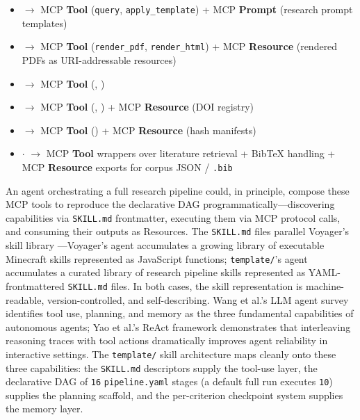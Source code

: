 \documentclass[
  english,
]{article}
\providecommand{\tightlist}{%
  \setlength{\itemsep}{0pt}\setlength{\parskip}{0pt}}
\begin{document}
\begin{itemize}
\tightlist
\item
   \texorpdfstring{\ensuremath{\to}}{->} MCP \textbf{Tool} (\texttt{query},
  \texttt{apply\_template}) + MCP \textbf{Prompt} (research prompt
  templates)
\item
   \texorpdfstring{\ensuremath{\to}}{->} MCP \textbf{Tool}
  (\texttt{render\_pdf}, \texttt{render\_html}) + MCP \textbf{Resource}
  (rendered PDFs as URI-addressable resources)
\item
   \texorpdfstring{\ensuremath{\to}}{->} MCP \textbf{Tool}
  (, )
\item
   \texorpdfstring{\ensuremath{\to}}{->} MCP \textbf{Tool}
  (, ) +
  MCP \textbf{Resource} (DOI registry)
\item
   \texorpdfstring{\ensuremath{\to}}{->} MCP \textbf{Tool}
  () + MCP \textbf{Resource}
  (hash manifests)
\item
   \texorpdfstring{\ensuremath{\cdot}}{.}  \texorpdfstring{\ensuremath{\to}}{->}
  MCP \textbf{Tool} wrappers over literature retrieval + BibTeX handling
  + MCP \textbf{Resource} exports for corpus JSON / \texttt{.bib}
\end{itemize}

An agent orchestrating a full research pipeline could, in principle,
compose these MCP tools to reproduce the declarative DAG
programmatically---discovering capabilities via \texttt{SKILL.md}
frontmatter, executing them via MCP protocol calls, and consuming their
outputs as Resources. The \texttt{SKILL.md} files parallel Voyager's
skill library \citep{wang2023voyager}---Voyager's agent accumulates a
growing library of executable Minecraft skills represented as JavaScript
functions; \texttt{template/}'s agent accumulates a curated library of
research pipeline skills represented as YAML-frontmattered
\texttt{SKILL.md} files. In both cases, the skill representation is
machine-readable, version-controlled, and self-describing. Wang et al.'s
LLM agent survey \citep{wang2024llmagents} identifies tool use,
planning, and memory as the three fundamental capabilities of autonomous
agents; Yao et al.'s ReAct framework \citep{yao2023react} demonstrates
that interleaving reasoning traces with tool actions dramatically
improves agent reliability in interactive settings. The
\texttt{template/} skill architecture maps cleanly onto these three
capabilities: the \texttt{SKILL.md} descriptors supply the tool-use
layer, the declarative DAG of \texttt{16} \texttt{pipeline.yaml} stages
(a default full run executes \texttt{10}) supplies the planning
scaffold, and the per-criterion checkpoint system supplies the memory
layer.
\end{document}
